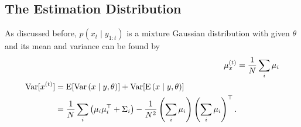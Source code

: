 \subsection*{The Estimation Distribution}

As discussed before, $p\left(x_t \mid y_{1:t}\right)$ is a mixture Gaussian distribution with given $\theta$ and its mean and variance can be found by 
\begin{align}
\mu_x^{\left(t\right)} &= \frac{1}{N} \sum_i \mu_i\\
\begin{split}\mathrm{Var}\lbrack x^{\left(t\right)}\rbrack
&= \mathrm{E}\lbrack \mathrm{Var}\left(x\mid y,\theta\right)\rbrack + \mathrm{Var}\lbrack\mathrm{E}\left(x\mid y,\theta\right)\rbrack \\
&= \frac{1}{N} \sum_i \left(\mu_i \mu_i^\top +\Sigma_i\right) -\frac{1}{N^2} \left(\sum_i  \mu_i\right)\left(\sum_i \mu_i\right)^\top. 
\end{split}
\end{align}

